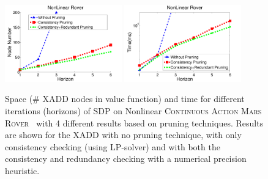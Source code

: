 \documentclass[twoside,11pt]{article}
\newcommand{\MarsRover}{\textsc{Mars Rover }}
\begin{document}
\begin{figure}[t]
\centering
\includegraphics[width=0.45\textwidth]{pics/contRoverNode2.pdf}
\includegraphics[width=0.45\textwidth]{pics/contRoverTime2.pdf}
\vspace{-3mm}
\caption{%
Space (\# XADD nodes in value function) and
time for different iterations (horizons) of SDP on Nonlinear \textsc{Continuous Action}  \MarsRover\ with 4 different results based on pruning techniques. Results are shown for  the XADD 
 with no pruning technique, with only consistency checking (using LP-solver) and with both the consistency and redundancy checking with a numerical precision heuristic.} %
\label{fig:roverTS}
\end{figure}
\end{document}
